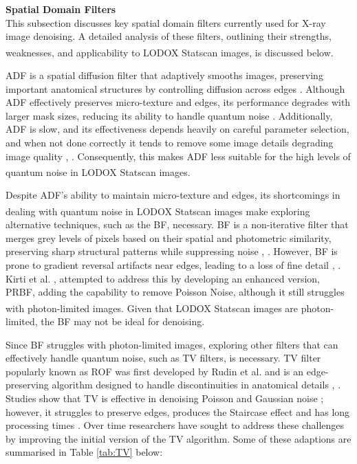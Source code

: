 \textbf{Spatial Domain Filters} \\
This subsection discusses key spatial domain filters currently used for X-ray image denoising. A detailed analysis of these filters, outlining their strengths, weaknesses, and applicability to LODOX\textsuperscript{\textregistered} Statscan\textsuperscript{\textregistered} images, is discussed below. 

\gls{ADF} is a spatial diffusion filter that adaptively smooths images, preserving important anatomical structures by controlling diffusion across edges \cite{chandra_analysis_2020}
. Although \gls{ADF} effectively preserves micro-texture and edges, its performance degrades with larger mask sizes, reducing its ability to handle quantum noise \cite{chandra_analysis_2020}
. Additionally, \gls{ADF} is slow, and its effectiveness depends heavily on careful parameter selection, and when not done correctly it tends to remove some image details degrading image quality \cite{juneja_denoising_2024}, \cite{chandra_analysis_2020}
. Consequently, this makes \gls{ADF} less suitable for the high levels of quantum noise in LODOX\textsuperscript{\textregistered} Statscan\textsuperscript{\textregistered} images.

Despite \gls{ADF}'s ability to maintain micro-texture and edges, its shortcomings in dealing with quantum noise in LODOX\textsuperscript{\textregistered} Statscan\textsuperscript{\textregistered} images make exploring alternative techniques, such as the \gls{BF}, necessary. \gls{BF} is a non-iterative filter that merges grey levels of pixels based on their spatial and photometric similarity, preserving sharp structural patterns while suppressing noise \cite{juneja_denoising_2024}, \cite{chandra_analysis_2020}. However, \gls{BF} is prone to gradient reversal artifacts near edges, leading to a loss of fine detail \cite{juneja_denoising_2024}, \cite{chandra_analysis_2020}. Kirti et al. \cite{thanh_review_2019},\cite{thakur_poisson_2016} attempted to address this by developing an enhanced version, \gls{PRBF}, adding the capability to remove Poisson Noise, although it still struggles with photon-limited images. Given that LODOX\textsuperscript{\textregistered} Statscan\textsuperscript{\textregistered} images are photon-limited, the \gls{BF} may not be ideal for denoising.

Since \gls{BF} struggles with photon-limited images, exploring other filters that can effectively handle quantum noise, such as \gls{TV} filters, is necessary. \gls{TV} filter popularly known as \gls{ROF} was first developed by Rudin et al. \cite{rudin_nonlinear_1992} and is an edge-preserving algorithm designed to handle discontinuities in anatomical details \cite{khan_new_2016}, \cite{rodrigues_denoising_2008}. Studies show that \gls{TV} is effective in denoising Poisson and Gaussian noise \cite{rodrigues_denoising_2008}; however, it struggles to preserve edges, produces the \gls{Staircase effect} \cite{rodrigues_denoising_2008} and has long processing times \cite{lee_x-ray_2018}. Over time researchers have sought to address these challenges by improving the initial version of the \gls{TV} algorithm.  Some of these adaptions are summarised in Table \ref{tab:TV} below:

